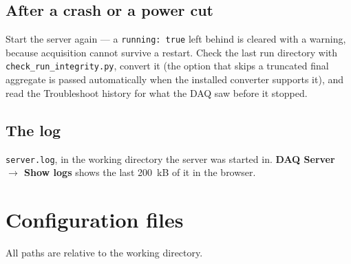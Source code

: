 \documentclass[11pt,a4paper]{report}
\newcommand{\cmd}[1]{\texttt{#1}}
\newcommand{\ui}[1]{\textbf{#1}}          %
\newcommand{\file}[1]{\texttt{#1}}
\begin{document}
\section{After a crash or a power cut}

Start the server again --- a \cmd{running: true} left behind is cleared with a
warning, because acquisition cannot survive a restart. Check the last run
directory with \cmd{check\_run\_integrity.py}, convert it (the option that skips a
truncated final aggregate is passed automatically when the installed converter
supports it), and read the Troubleshoot history for what the DAQ saw before it
stopped.

\section{The log}

\file{server.log}, in the working directory the server was started in.
\ui{DAQ Server $\rightarrow$ Show logs} shows the last 200~kB of it in the
browser.

\appendix

\chapter{Configuration files}

All paths are relative to the working directory.
\end{document}
